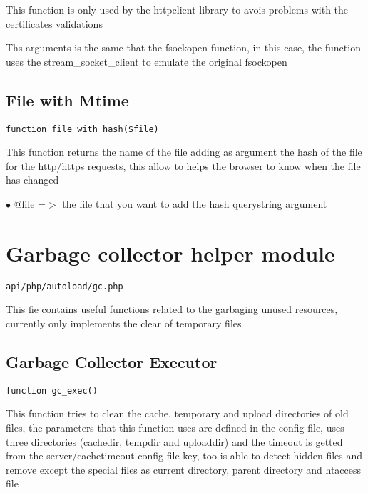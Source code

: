 \documentclass[a4paper]{book}
\begin{document}
This function is only used by the httpclient library to avois problems with
the certificates validations

Ths arguments is the same that the fsockopen function, in this case, the
function uses the stream\_socket\_client to emulate the original fsockopen

\hypertarget{toc141}{}
\subsection{File with Mtime}

\begin{lstlisting}
function file_with_hash($file)
\end{lstlisting}

This function returns the name of the file adding as argument the hash
of the file for the http/https requests, this allow to helps the browser
to know when the file has changed

\begin{compactitem}
\item[\color{myblue}$\bullet$] @file =$>$ the file that you want to add the hash querystring argument
\end{compactitem}

\hypertarget{toc142}{}
\section{Garbage collector helper module}

\begin{lstlisting}
api/php/autoload/gc.php
\end{lstlisting}

This fie contains useful functions related to the garbaging unused resources, currently only
implements the clear of temporary files

\hypertarget{toc143}{}
\subsection{Garbage Collector Executor}

\begin{lstlisting}
function gc_exec()
\end{lstlisting}

This function tries to clean the cache, temporary and upload directories
of old files, the parameters that this function uses are defined in the
config file, uses three directories (cachedir, tempdir and uploaddir) and
the timeout is getted from the server/cachetimeout config file key, too
is able to detect hidden files and remove except the special files as
current directory, parent directory and htaccess file
\end{document}
